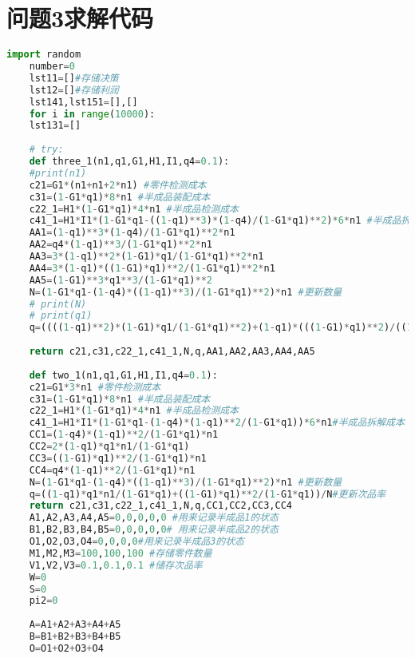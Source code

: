 \documentclass[withoutpreface,bwprint]{cumcmthesis} %
\begin{document}
 \section{问题3求解代码}
  \begin{lstlisting}[language=python]
 	import random
 	number=0
 	lst11=[]#存储决策
 	lst12=[]#存储利润
 	lst141,lst151=[],[]
 	for i in range(10000):
 	lst131=[]
 	
 	# try:
 	def three_1(n1,q1,G1,H1,I1,q4=0.1):
 	#print(n1)
 	c21=G1*(n1+n1+2*n1) #零件检测成本
 	c31=(1-G1*q1)*8*n1 #半成品装配成本
 	c22_1=H1*(1-G1*q1)*4*n1 #半成品检测成本
 	c41_1=H1*I1*(1-G1*q1-((1-q1)**3)*(1-q4)/(1-G1*q1)**2)*6*n1 #半成品拆解成本
 	AA1=(1-q1)**3*(1-q4)/(1-G1*q1)**2*n1
 	AA2=q4*(1-q1)**3/(1-G1*q1)**2*n1
 	AA3=3*(1-q1)**2*(1-G1)*q1/(1-G1*q1)**2*n1
 	AA4=3*(1-q1)*((1-G1)*q1)**2/(1-G1*q1)**2*n1
 	AA5=(1-G1)**3*q1**3/(1-G1*q1)**2
 	N=(1-G1*q1-(1-q4)*((1-q1)**3)/(1-G1*q1)**2)*n1 #更新数量
 	# print(N)
 	# print(q1)
 	q=((((1-q1)**2)*(1-G1)*q1/(1-G1*q1)**2)+(1-q1)*(((1-G1)*q1)**2)/((1-G1*q1)**2)*2+(1-q1)*(((1-G1)*q1)**2)/(1-G1*q1)**2)/N #更新次品率
 	
 	return c21,c31,c22_1,c41_1,N,q,AA1,AA2,AA3,AA4,AA5
 	
 	def two_1(n1,q1,G1,H1,I1,q4=0.1):
 	c21=G1*3*n1 #零件检测成本
 	c31=(1-G1*q1)*8*n1 #半成品装配成本
 	c22_1=H1*(1-G1*q1)*4*n1 #半成品检测成本
 	c41_1=H1*I1*(1-G1*q1-(1-q4)*(1-q1)**2/(1-G1*q1))*6*n1#半成品拆解成本
 	CC1=(1-q4)*(1-q1)**2/(1-G1*q1)*n1
 	CC2=2*(1-q1)*q1*n1/(1-G1*q1)
 	CC3=((1-G1)*q1)**2/(1-G1*q1)*n1
 	CC4=q4*(1-q1)**2/(1-G1*q1)*n1
 	N=(1-G1*q1-(1-q4)*((1-q1)**3)/(1-G1*q1)**2)*n1 #更新数量
 	q=((1-q1)*q1*n1/(1-G1*q1)+((1-G1)*q1)**2/(1-G1*q1))/N#更新次品率
 	return c21,c31,c22_1,c41_1,N,q,CC1,CC2,CC3,CC4
 	A1,A2,A3,A4,A5=0,0,0,0,0 #用来记录半成品1的状态
 	B1,B2,B3,B4,B5=0,0,0,0,0# 用来记录半成品2的状态
 	O1,O2,O3,O4=0,0,0,0#用来记录半成品3的状态
 	M1,M2,M3=100,100,100 #存储零件数量
 	V1,V2,V3=0.1,0.1,0.1 #储存次品率
 	W=0
 	S=0
 	pi2=0
 	
 	A=A1+A2+A3+A4+A5
 	B=B1+B2+B3+B4+B5
 	O=O1+O2+O3+O4
 	

\end{lstlisting}
\end{document}
